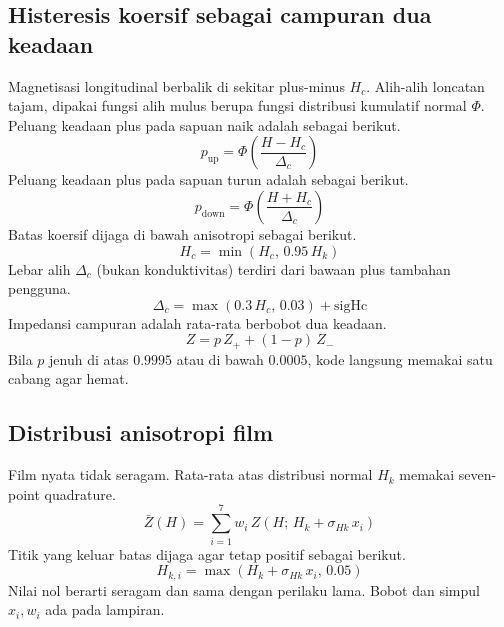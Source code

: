 \documentclass[a4paper,11pt]{article}
\begin{document}
\subsection{Histeresis koersif sebagai campuran dua keadaan}
Magnetisasi longitudinal berbalik di sekitar plus-minus $H_{c}$.
Alih-alih loncatan tajam, dipakai fungsi alih mulus berupa
fungsi distribusi kumulatif normal $\Phi$.
Peluang keadaan plus pada sapuan naik adalah sebagai berikut.
\begin{equation*}
p_{\mathrm{up}} = \Phi\!\left(\frac{H-H_{c}}{\Delta_{c}}\right)
\end{equation*}
Peluang keadaan plus pada sapuan turun adalah sebagai berikut.
\begin{equation*}
p_{\mathrm{down}} = \Phi\!\left(\frac{H+H_{c}}{\Delta_{c}}\right)
\end{equation*}
Batas koersif dijaga di bawah anisotropi sebagai berikut.
\begin{equation*}
H_{c} = \min(H_{c},\,0.95\,H_{k})
\end{equation*}
Lebar alih $\Delta_{c}$ (bukan konduktivitas) terdiri dari bawaan plus tambahan pengguna.
\begin{equation*}
\Delta_{c} = \max(0.3\,H_{c},\,0.03)+\mathrm{sigHc}
\end{equation*}
Impedansi campuran adalah rata-rata berbobot dua keadaan.
\begin{equation*}
Z = p\,Z_{+}+(1-p)\,Z_{-}
\end{equation*}
Bila $p$ jenuh di atas $0.9995$ atau di bawah $0.0005$,
kode langsung memakai satu cabang agar hemat.

\subsection{Distribusi anisotropi film}
Film nyata tidak seragam.
Rata-rata atas distribusi normal $H_{k}$ memakai seven-point quadrature.
\begin{equation*}
\bar Z(H) = \sum_{i=1}^{7} w_{i}\,Z(H;\,H_{k}+\sigma_{Hk}\,x_{i})
\end{equation*}
Titik yang keluar batas dijaga agar tetap positif sebagai berikut.
\begin{equation*}
H_{k,i} = \max(H_{k}+\sigma_{Hk}\,x_{i},\,0.05)
\end{equation*}
Nilai nol berarti seragam dan sama dengan perilaku lama.
Bobot dan simpul $x_{i},w_{i}$ ada pada lampiran.

\end{document}
